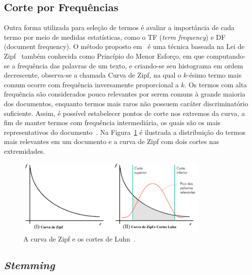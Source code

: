 \subsection*{Corte por Frequências}

Outra forma utilizada para seleção de termos é avaliar a importância de cada termo por meio de medidas estatísticas, como o TF (\textit{term frequency}) e DF (document frequency). O método proposto em~\cite{Luhn1958} é uma técnica baseada na Lei de Zipf~\cite{zipf1932} também conhecida como Princípio do Menor Esforço, em que computando-se a frequência das palavras de um texto, e criando-se seu histograma em ordem decrescente, observa-se a chamada Curva de Zipf, na qual o $k$-ésimo termo mais comum ocorre com frequência inversamente proporcional a $k$. Os termos com alta frequência são considerados pouco relevantes por serem comuns à grande maioria dos documentos, enquanto termos mais raros não possuem caráter discriminatório suficiente. Assim, é possível estabelecer pontos de corte nos extremos da curva, a fim de manter termos com frequência intermediária, os quais são os mais representativos do documento~\cite{Maracini2010}. Na Figura~\ref{fig:luhn} é ilustrada a distribuição do termos mais relevantes em um documento e a curva de Zipf com dois cortes nas extremidades.


  \begin{figure}[!h]
	  \centering
	  \includegraphics[width=0.85\textwidth]{conteudo/capitulos/figs/luhn2.png}
	  \caption{A curva de Zipf e os cortes de Luhn~\cite{Soares2008}.}
	  \label{fig:luhn}
  \end{figure}




\subsection*{\textit{Stemming}}


